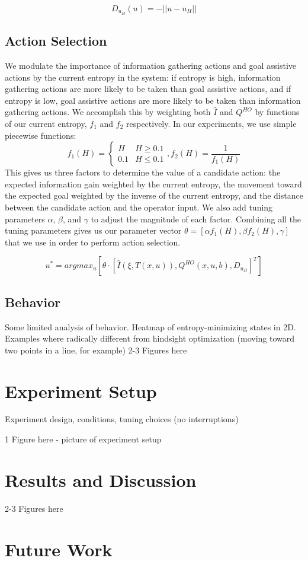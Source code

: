 \documentclass[conference]{IEEEtran}
\begin{document}
\[
D_{u_H}(u) = -||u - u_H||
\]


\subsection{Action Selection}

We modulate the importance of information gathering actions and goal assistive actions by the current entropy in the system: if entropy is high, information gathering actions are more likely to be taken than goal assistive actions, and if entropy is low, goal assistive actions are more likely to be taken than information gathering actions. We accomplish this by weighting both $\hat{I}$ and $Q^{HO}$ by functions of our current entropy, $f_1$ and $f_2$ respectively. In our experiments, we use simple piecewise functions:
\[
f_1(H) = 
\begin{cases}
H & H\geq 0.1 \\
0.1 & H\leq 0.1
\end{cases}
,f_2(H) = \frac{1}{f_1(H)}
\]
This gives us three factors to determine the value of a candidate action: the expected information gain weighted by the current entropy, the movement toward the expected goal weighted by the inverse of the current entropy, and the distance between the candidate action and the operator input. We also add tuning parameters $\alpha$, $\beta$, and $\gamma$ to adjust the magnitude of each factor. Combining all the tuning parameters gives us our parameter vector $\theta = [\alpha f_1(H), \beta f_2(H), \gamma]$ that we use in order to perform action selection.

\[
u^* = argmax_u [ \theta \cdot [\hat{I}(\xi, T(x,u)), Q^{HO}(x,u,b), D_{u_H}]^T ]
\]

\subsection{Behavior}

Some limited analysis of behavior. Heatmap of entropy-minimizing states in 2D. Examples where radically different from hindsight optimization (moving toward two points in a line, for example)
2-3 Figures here

\section{Experiment Setup}

Experiment design, conditions, tuning choices (no interruptions)

1 Figure here - picture of experiment setup

\section{Results and Discussion}
2-3 Figures here

\section{Future Work}



\end{document}
